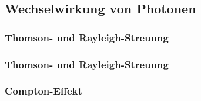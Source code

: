 \documentclass{article}
\begin{document}
\graphicspath{{bilder/1-2/}}
	\subsection{Wechselwirkung von Photonen}
		
			\subsubsection{Thomson- und Rayleigh-Streuung}
				
			\subsubsection{Thomson- und Rayleigh-Streuung}
				 
			\subsubsection{Compton-Effekt}
				

% 
% 		
% 		
% 		
% 		
% 		
% 		
% 		
				
				
\end{document}
